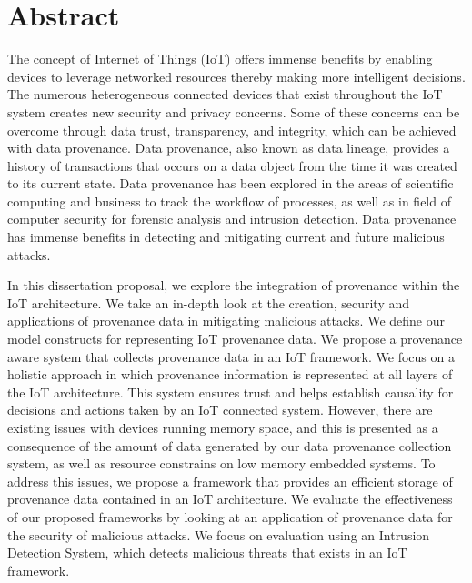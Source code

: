 

\chapter*{Abstract}
The concept of Internet of Things (IoT) offers immense benefits by
enabling devices to leverage networked resources thereby making more intelligent
decisions. The numerous heterogeneous connected devices that exist throughout
the IoT system creates new security and privacy concerns. Some of these concerns can
be overcome through data trust, transparency, and integrity, which can be
achieved with data provenance. Data provenance, also known as data lineage, provides a history of transactions that occurs on a data object from the time it was created to its current state. Data provenance has been explored in the areas of scientific computing and business to track the workflow of processes, as well as in field of computer security for forensic analysis and intrusion detection. Data provenance has immense benefits in detecting and mitigating current and future malicious attacks.  \par In this dissertation proposal, we explore the integration of provenance within the IoT architecture. We take an in-depth look at the creation, security and applications of provenance data in mitigating malicious attacks. We define our model constructs for representing IoT provenance data. We propose a provenance aware system that collects provenance data in an IoT framework. We focus on a holistic approach in which provenance information is represented at all layers of the IoT architecture. This system ensures trust and helps establish causality for decisions and actions taken by an IoT connected system. However, there are existing issues with devices running memory space, and this is presented as a consequence of the amount of data generated by our data provenance collection system, as well as resource constrains on low memory embedded systems. To address this issues, we propose a framework that provides an efficient storage of provenance data contained in an IoT architecture. We evaluate the effectiveness of our proposed frameworks by looking at an application of provenance data for the security of malicious attacks. We focus on evaluation using an Intrusion Detection System, which detects malicious threats that exists in an IoT framework.



